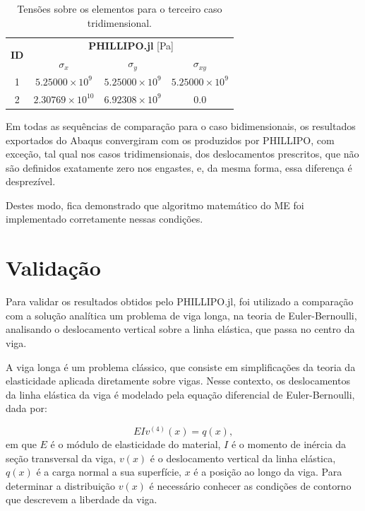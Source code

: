 \begin{table}
    \centering
    \caption{Tensões sobre os elementos para o terceiro caso tridimensional.}
    \begin{tabular}{c | c c c}
        \toprule
        \multirow{2}{*}{\textbf{ID}} & \multicolumn{3}{c}{\textbf{PHILLIPO.jl} [Pa]}  \\
                                           & \textbf{$\sigma_x$} & \textbf{$\sigma_y$} & \textbf{$\sigma_{xy}$} \\                            
        \midrule
        1 & $5.25000\times10^{9}$ & $5.25000\times10^{9}$ & $5.25000\times10^{9}$ \\
        2 & $2.30769\times10^{10}$ & $6.92308\times10^{9}$ & $0.0$ \\
        \bottomrule
    \end{tabular}
    \label{tab:verificacao_quadrado_3_tensoes}
\end{table}


Em todas as sequências de comparação para o caso bidimensionais, os resultados exportados do Abaqus convergiram com os produzidos por PHILLIPO, com exceção, tal qual nos casos tridimensionais, dos deslocamentos prescritos, que não são definidos exatamente zero nos engastes, e, da mesma forma, essa diferença é desprezível.

Destes modo, fica demonstrado que algoritmo matemático do ME foi implementado corretamente nessas condições. 

\section{Validação}

Para validar os resultados obtidos pelo PHILLIPO.jl, foi utilizado a comparação com a solução analítica um problema de viga longa, na teoria de Euler-Bernoulli, analisando o deslocamento vertical sobre a linha elástica, que passa no centro da viga.

A viga longa é um problema clássico, que consiste em simplificações da teoria da elasticidade aplicada diretamente sobre vigas. Nesse contexto, os deslocamentos da linha elástica da viga é modelado pela equação diferencial de Euler-Bernoulli, dada por:

\begin{equation}
    EI v^{(4)}(x) = q(x),
\end{equation}
em que $E$ é o módulo de elasticidade do material, $I$ é o momento de inércia da seção transversal da viga, $v(x)$ é o deslocamento vertical da linha elástica, $q(x)$ é a carga normal a sua superfície, $x$ é a posição ao longo da viga. Para determinar a distribuição $v(x)$ é necessário conhecer as condições de contorno que descrevem a liberdade da viga. \cite{Hibbeler}

